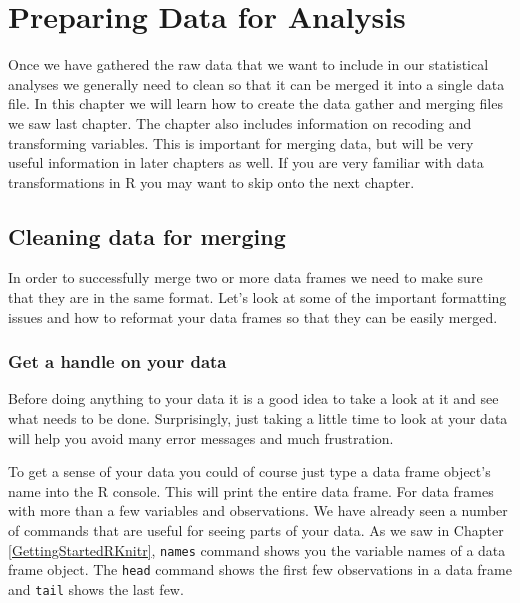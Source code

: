 



\chapter{Preparing Data for Analysis}\label{DataClean}

Once we have gathered the raw data that we want to include in our statistical analyses we generally need to clean so that it can be merged it into a single data file. In this chapter we will learn how to create the data gather and merging files we saw last chapter. The chapter also includes information on recoding and transforming variables. This is important for merging data, but will be very useful information in later chapters as well. If you are very familiar with data transformations in R you may want to skip onto the next chapter. 

\section{Cleaning data for merging}

In order to successfully merge two or more data frames we need to make sure that they are in the same format. Let's look at some of the important formatting issues and how to reformat your data frames so that they can be easily merged.

\subsection{Get a handle on your data}

Before doing anything to your data it is a good idea to take a look at it and see what needs to be done. Surprisingly, just taking a little time to look at your data will help you avoid many error messages and much frustration. 

To get a sense of your data you could of course just type a data frame object's name into the R console. This will print the entire data frame. For data frames with more than a few variables and observations. We have already seen a number of commands that are useful for seeing parts of your data. As we saw in Chapter \ref{GettingStartedRKnitr}, \texttt{names} command shows you the variable names of a data frame object. The \texttt{head} command shows the first few observations in a data frame and \texttt{tail} shows the last few.

